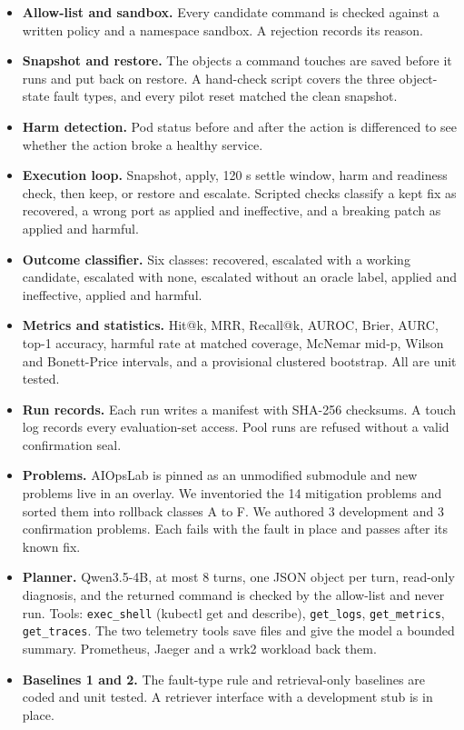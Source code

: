 \documentclass[10pt,conference]{IEEEtran}
\newcommand{\code}[1]{\texttt{#1}}
\begin{document}
\begin{itemize}
\item \textbf{Allow-list and sandbox.} Every candidate command is checked against a written
policy and a namespace sandbox. A rejection records its reason.
\item \textbf{Snapshot and restore.} The objects a command touches are saved before it
runs and put back on restore. A hand-check script covers the three object-state fault
types, and every pilot reset matched the clean snapshot.
\item \textbf{Harm detection.} Pod status before and after the action is differenced to see
whether the action broke a healthy service.
\item \textbf{Execution loop.} Snapshot, apply, 120 s settle window, harm and readiness
check, then keep, or restore and escalate. Scripted checks classify a kept fix as
recovered, a wrong port as applied and ineffective, and a breaking patch as applied and
harmful.
\item \textbf{Outcome classifier.} Six classes: recovered, escalated with a working
candidate, escalated with none, escalated without an oracle label, applied and ineffective,
applied and harmful.
\item \textbf{Metrics and statistics.} Hit@k, MRR, Recall@k, AUROC, Brier, AURC, top-1
accuracy, harmful rate at matched coverage, McNemar mid-p, Wilson and Bonett-Price
intervals, and a provisional clustered bootstrap. All are unit tested.
\item \textbf{Run records.} Each run writes a manifest with SHA-256 checksums. A touch log
records every evaluation-set access. Pool runs are refused without a valid confirmation
seal.
\item \textbf{Problems.} AIOpsLab is pinned as an unmodified submodule and new problems live
in an overlay. We inventoried the 14 mitigation problems and sorted them into rollback
classes A to F. We authored 3 development and 3 confirmation problems. Each fails with the
fault in place and passes after its known fix.
\item \textbf{Planner.} Qwen3.5-4B, at most 8 turns, one JSON object per turn, read-only
diagnosis, and the returned command is checked by the allow-list and never run. Tools:
\code{exec\_shell} (kubectl get and describe), \code{get\_logs}, \code{get\_metrics},
\code{get\_traces}. The two telemetry tools save files and give the model a bounded
summary. Prometheus, Jaeger and a wrk2 workload back them.
\item \textbf{Baselines 1 and 2.} The fault-type rule and retrieval-only baselines are coded
and unit tested. A retriever interface with a development stub is in place.
\end{itemize}
\end{document}
